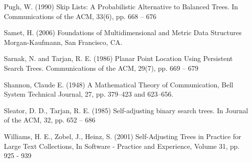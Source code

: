 \documentclass[mcs]{scsthesis}
\begin{document}
\begin{thebibliography}{5}
Pugh, W. (1990) Skip Lists: A Probabilistic Alternative to Balanced Trees.
In Communications of the ACM, 33(6), pp. 668 – 676

Samet, H. (2006) Foundations of Multidimensional and Metric Data Structures
Morgan-Kaufmann, San Francisco, CA.

Sarnak, N. and Tarjan, R. E. (1986) Planar Point Location Using Persistent
Search Trees. Communications of the ACM, 29(7), pp. 669 -- 679

Shannon, Claude E. (1948) A Mathematical Theory of Communication,
Bell System Technical Journal, 27, pp. 379--423 and 623--656.

Sleator, D. D., Tarjan, R. E. (1985) Self-adjusting binary search trees.
In Journal of the ACM, 32, pp. 652 – 686

Williams, H. E., Zobel, J., Heinz, S. (2001) Self-Adjusting Trees in Practice
for Large Text Collections, In Software - Practice and Experience,
Volume 31, pp. 925 - 939

\end{thebibliography}
\end{document}
